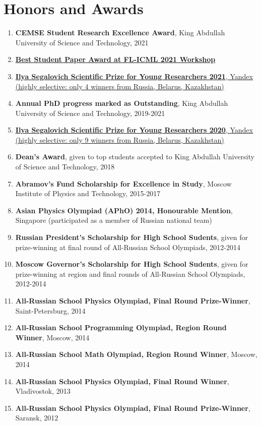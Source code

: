 \section{Honors and Awards}
\hypersetup{colorlinks,breaklinks,urlcolor=black,linkcolor=black}
\begin{enumerate}
	\item  \textbf{CEMSE Student Research Excellence Award}, King Abdullah University of Science and Technology, 2021
	\item \href{http://federated-learning.org/fl-icml-2021/}{\textbf{Best Student Paper Award at FL-ICML 2021 Workshop}}
	\item \href{https://yandex.com/scholarships/#laureates}{\textbf{Ilya Segalovich Scientific Prize for Young Researchers 2021}, Yandex (highly selective: only 4 winners from Russia, Belarus, Kazakhstan)}
	\item {\bf  Annual PhD progress marked as Outstanding}, King Abdullah University of Science and Technology, 2019-2021
	\item \href{https://yandex.com/scholarships/#laureates}{\textbf{Ilya Segalovich Scientific Prize for Young Researchers 2020}, Yandex (highly selective: only 9 winners from Russia, Belarus, Kazakhstan)}
	\item {\bf Dean's Award}, given to top students accepted to King Abdullah University of Science and Technology, 2018
	\item \textbf{Abramov’s Fund Scholarship for Excellence in Study}, Moscow Institute of Physics and Technology, 2015-2017
	\item \textbf{Asian Physics Olympiad (APhO) 2014, Honourable Mention}, Singapore (participated as a member of Russian national team)
	
	\item \textbf{Russian President’s Scholarship for High School Sudents}, given for prize-winning at final round of All-Russian School Olympiads, 2012-2014
	\item \textbf{Moscow Governor’s Scholarship for High School Sudents}, given for prize-winning at region and final rounds of All-Russian School Olympiads, 2012-2014
	
	\item \textbf{All-Russian School Physics Olympiad, Final Round Prize-Winner}, Saint-Petersburg, 2014
	\item \textbf{All-Russian School Programming Olympiad, Region Round Winner}, Moscow, 2014
	\item \textbf{All-Russian School Math Olympiad, Region Round Winner}, Moscow, 2014
	
	\item \textbf{All-Russian School Physics Olympiad, Final Round Winner}, Vladivostok, 2013
	\item \textbf{All-Russian School Physics Olympiad, Final Round Prize-Winner}, Saransk, 2012
\end{enumerate}
